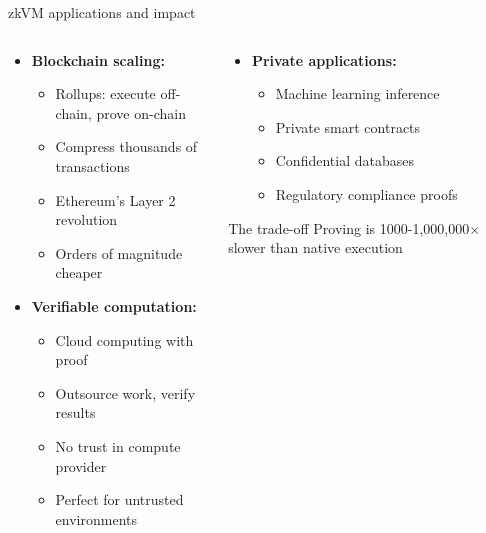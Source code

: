 \documentclass[aspectratio=169, lualatex, handout]{beamer}
\begin{document}
\begin{frame}{zkVM applications and impact}
	\begin{columns}[c]
		\begin{column}{0.5\textwidth}
			\begin{itemize}
				\item \textbf{Blockchain scaling:}
				      \begin{itemize}
					      \item Rollups: execute off-chain, prove on-chain
					      \item Compress thousands of transactions
					      \item Ethereum's Layer 2 revolution
					      \item Orders of magnitude cheaper
				      \end{itemize}
				\item \textbf{Verifiable computation:}
				      \begin{itemize}
					      \item Cloud computing with proof
					      \item Outsource work, verify results
					      \item No trust in compute provider
					      \item Perfect for untrusted environments
				      \end{itemize}
			\end{itemize}
		\end{column}
		\begin{column}{0.5\textwidth}
			\begin{itemize}
				\item \textbf{Private applications:}
				      \begin{itemize}
					      \item Machine learning inference
					      \item Private smart contracts
					      \item Confidential databases
					      \item Regulatory compliance proofs
				      \end{itemize}
			\end{itemize}
			\begin{alertblock}{The trade-off}
				Proving is 1000-1,000,000$\times$ slower than native execution
			\end{alertblock}
		\end{column}
	\end{columns}
\end{frame}
\end{document}
